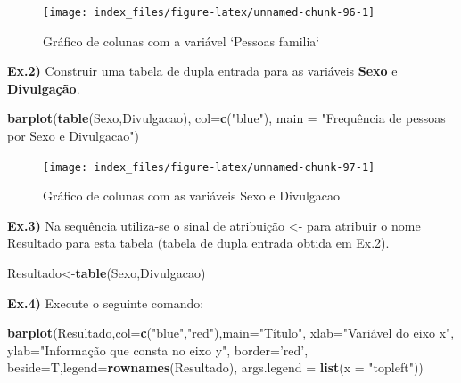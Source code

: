 \documentclass[12pt,brazil,oneside]{book}
\newenvironment{Shaded}{\begin{snugshade}}{\end{snugshade}}
\newcommand{\DataTypeTok}[1]{\textcolor[rgb]{0.13,0.29,0.53}{#1}}
\newcommand{\KeywordTok}[1]{\textcolor[rgb]{0.13,0.29,0.53}{\textbf{#1}}}
\newcommand{\NormalTok}[1]{#1}
\newcommand{\StringTok}[1]{\textcolor[rgb]{0.31,0.60,0.02}{#1}}
\begin{document}
\begin{figure}[H]

{\centering \texttt{[image: index\_files/figure-latex/unnamed-chunk-96-1]} 

}

\caption{Gráfico de colunas com a variável `Pessoas familia`}\label{fig:unnamed-chunk-96}
\end{figure}

\textbf{Ex.2)} Construir uma tabela de dupla entrada para as variáveis \textbf{Sexo} e \textbf{Divulgação}.

\begin{Shaded}
\begin{Highlighting}[]
\KeywordTok{barplot}\NormalTok{(}\KeywordTok{table}\NormalTok{(Sexo,Divulgacao), }
        \DataTypeTok{col=}\KeywordTok{c}\NormalTok{(}\StringTok{"blue"}\NormalTok{), }
        \DataTypeTok{main =} \StringTok{"Frequência de pessoas por Sexo e Divulgacao"}\NormalTok{)}
\end{Highlighting}
\end{Shaded}

\begin{figure}[H]

{\centering \texttt{[image: index\_files/figure-latex/unnamed-chunk-97-1]} 

}

\caption{Gráfico de colunas com as variáveis Sexo e Divulgacao}\label{fig:unnamed-chunk-97}
\end{figure}

\textbf{Ex.3)} Na sequência utiliza-se o sinal de atribuição \textless{}- para atribuir o nome Resultado para esta tabela (tabela de dupla entrada obtida em Ex.2).

\begin{Shaded}
\begin{Highlighting}[]
\NormalTok{Resultado<-}\KeywordTok{table}\NormalTok{(Sexo,Divulgacao)}
\end{Highlighting}
\end{Shaded}

\textbf{Ex.4)} Execute o seguinte comando:

\begin{Shaded}
\begin{Highlighting}[]
\KeywordTok{barplot}\NormalTok{(Resultado,}\DataTypeTok{col=}\KeywordTok{c}\NormalTok{(}\StringTok{"blue"}\NormalTok{,}\StringTok{"red"}\NormalTok{),}\DataTypeTok{main=}\StringTok{"Título"}\NormalTok{,}
        \DataTypeTok{xlab=}\StringTok{"Variável do eixo x"}\NormalTok{,}
        \DataTypeTok{ylab=}\StringTok{"Informação que consta no eixo y"}\NormalTok{, }
        \DataTypeTok{border=}\StringTok{'red'}\NormalTok{, }
        \DataTypeTok{beside=}\NormalTok{T,}\DataTypeTok{legend=}\KeywordTok{rownames}\NormalTok{(Resultado),}
        \DataTypeTok{args.legend =} \KeywordTok{list}\NormalTok{(}\DataTypeTok{x =} \StringTok{"topleft"}\NormalTok{))}
\end{Highlighting}
\end{Shaded}
\end{document}

